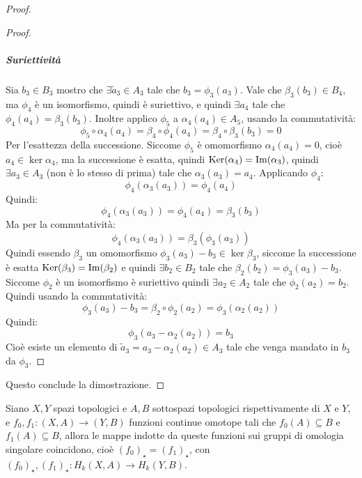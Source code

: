 \begin{proof}
\begin{proof}
    \subparagraph{Suriettività} Sia $ b_3 \in B_3 $ mostro che
    $ \exists \tilde{a}_3 \in A_3 $ tale che $ b_3 = \phi_3(a_3) $. Vale che
    $ \beta_3(b_3) \in B_4 $, ma $ \phi_4 $ è un isomorfismo, quindi è suriettivo, e
    quindi $ \exists a_4 $ tale che $ \phi_4(a_4) = \beta_3(b_3) $. Inoltre applico $ \phi_5 $
    a $ \alpha_4(a_4) \in A_5 $, usando la commutatività:
    \[
      \phi_5 \circ \alpha_4 (a_4) = \beta_4 \circ \phi_4 (a_4) = \beta_4 \circ \beta_3 (b_3) = 0
    \]
    Per l'esattezza della successione.
    Siccome $ \phi_5 $ è omomorfismo $ \alpha_4(a_4) = 0 $, cioè $ a_4 \in \ker{\alpha_4} $,
    ma la successione è esatta, quindi $ \mathrm{Ker}( \alpha_4) = \mathrm{Im}( \alpha_3 ) $, quindi
    $ \exists a_3 \in A_3 $ (non è lo stesso di prima) tale che $ \alpha_3(a_3) = a_4 $.
    Applicando $ \phi_4 $:
    \[
      \phi_4 (\alpha_3(a_3)) = \phi_4(a_4)
    \]
    Quindi:
    \[
      \phi_4 (\alpha_3(a_3)) = \phi_4(a_4) = \beta_3(b_3)
    \]
    Ma per la commutatività:
    \[
      \phi_4 (\alpha_3(a_3)) = \beta_3(\phi_3(a_3))
    \]
    Quindi essendo $ \beta_3 $ un omomorfismo $ \phi_3(a_3) - b_3 \in \ker{\beta_3} $,
    siccome la successione è esatta $ \mathrm{Ker}( \beta_3) = \mathrm{Im}( \beta_2 ) $ e quindi
    $ \exists b_2 \in B_2 $ tale che $ \beta_2(b_2) = \phi_3(a_3) - b_3 $. Siccome $ \phi_2 $
    è un isomorfismo è suriettivo quindi $ \exists a_2 \in A_2 $ tale che $ \phi_2(a_2) = b_2 $.
    Quindi usando la commutatività:
    \[
      \phi_3(a_3) - b_3 = \beta_2 \circ \phi_2 (a_2) = \phi_3(\alpha_2(a_2))
    \]
    Quindi:
    \[
      \phi_3(a_3 - \alpha_2(a_2)) = b_3
    \]
    Cioè esiste un elemento di $ \tilde{a}_3 = a_3 - \alpha_2(a_2) \in A_3 $ tale che
    venga mandato in $ b_3 $ da $ \phi_3 $.
  \end{proof}
  Questo conclude la dimostrazione.
\end{proof}
\begin{theorem}
  Siano $ X, Y $ spazi topologici e $ A, B $ sottospazi topologici
  rispettivamente di $ X $ e $ Y $, e $ f_0, f_1 \colon (X, A) \to (Y, B) $ funzioni
  continue omotope tali che $ f_0(A) \subseteq B $ e $ f_1(A) \subseteq B $, allora le mappe
  indotte da queste funzioni sui gruppi di omologia singolare coincidono, cioè
  $ (f_0)_\star = (f_1)_\star $, con $ (f_0)_\star, (f_1)_\star \colon H_k(X,A) \to H_k(Y,B) $.
\end{theorem}
